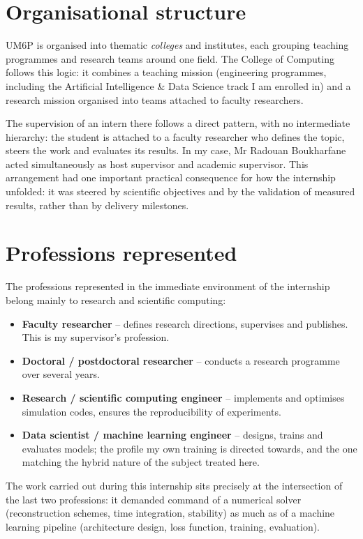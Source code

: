 \documentclass[12pt,a4paper,oneside]{report}
\begin{document}
\section{Organisational structure}

UM6P is organised into thematic \emph{colleges} and institutes, each grouping
teaching programmes and research teams around one field. The College of
Computing follows this logic: it combines a teaching mission (engineering
programmes, including the Artificial Intelligence \& Data Science track I am
enrolled in) and a research mission organised into teams attached to
faculty researchers.

The supervision of an intern there follows a direct pattern, with no
intermediate hierarchy: the student is attached to a faculty researcher who
defines the topic, steers the work and evaluates its results. In my case,
Mr Radouan Boukharfane acted simultaneously as host supervisor and academic
supervisor. This arrangement had one important practical consequence for how
the internship unfolded: it was steered by scientific objectives and by the
validation of measured results, rather than by delivery milestones.

\section{Professions represented}

The professions represented in the immediate environment of the internship
belong mainly to research and scientific computing:

\begin{itemize}
  \item \textbf{Faculty researcher} -- defines research directions, supervises
  and publishes. This is my supervisor's profession.
  \item \textbf{Doctoral / postdoctoral researcher} -- conducts a research
  programme over several years.
  \item \textbf{Research / scientific computing engineer} -- implements and
  optimises simulation codes, ensures the reproducibility of experiments.
  \item \textbf{Data scientist / machine learning engineer} -- designs, trains
  and evaluates models; the profile my own training is directed towards, and
  the one matching the hybrid nature of the subject treated here.
\end{itemize}

The work carried out during this internship sits precisely at the intersection
of the last two professions: it demanded command of a numerical solver
(reconstruction schemes, time integration, stability) as much as of a machine
learning pipeline (architecture design, loss function, training, evaluation).
\end{document}
